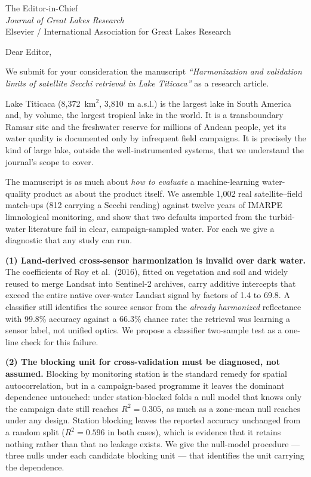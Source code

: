 \documentclass[11pt]{letter}
\begin{document}
\begin{letter}{The Editor-in-Chief\\ \textit{Journal of Great Lakes Research}\\
Elsevier / International Association for Great Lakes Research}
\opening{Dear Editor,}

We submit for your consideration the manuscript \textit{``Harmonization and
validation limits of satellite Secchi retrieval in Lake Titicaca''} as a research article.

Lake Titicaca (8{,}372~km$^2$, 3{,}810~m a.s.l.) is the largest lake in South
America and, by volume, the largest tropical lake in the world. It is a
transboundary Ramsar site and the freshwater reserve for millions of Andean
people, yet its water quality is documented only by infrequent field campaigns.
It is precisely the kind of large lake, outside the well-instrumented systems,
that we understand the journal's scope to cover.

The manuscript is as much about \emph{how to evaluate} a machine-learning
water-quality product as about the product itself. We assemble 1{,}002 real
satellite--field match-ups (812 carrying a Secchi reading) against twelve years
of IMARPE limnological monitoring, and show that two defaults imported from the
turbid-water literature fail in clear, campaign-sampled water. For each we give
a diagnostic that any study can run.

\textbf{(1) Land-derived cross-sensor harmonization is invalid over dark
water.} The coefficients of Roy et al.\ (2016), fitted on vegetation and soil
and widely reused to merge Landsat into Sentinel-2 archives, carry additive
intercepts that exceed the entire native over-water Landsat signal by factors
of 1.4 to 69.8. A classifier still identifies the source sensor from the
\emph{already harmonized} reflectance with 99.8\% accuracy against a 66.3\%
chance rate: the retrieval was learning a sensor label, not unified optics. We
propose a classifier two-sample test as a one-line check for this failure.

\textbf{(2) The blocking unit for cross-validation must be diagnosed, not
assumed.} Blocking by monitoring station is the standard remedy for spatial
autocorrelation, but in a campaign-based programme it leaves the dominant
dependence untouched: under station-blocked folds a null model that knows
only the campaign date still reaches $R^2=0.305$, as much as a zone-mean null
reaches under any design. Station blocking leaves the reported accuracy
unchanged from a random split ($R^2=0.596$ in both cases), which is evidence
that it retains nothing rather than that no leakage exists. We give the
null-model procedure --- three nulls under each candidate blocking unit ---
that identifies the unit carrying the dependence.


\end{letter}
\end{document}

